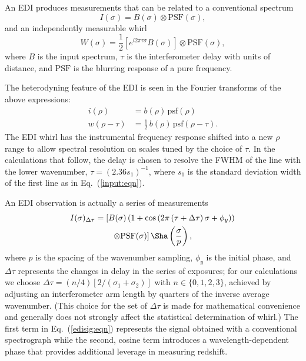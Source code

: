 \documentclass[preprint2, 10pt]{aastex}
\begin{document}
{An EDI produces measurements that can be related
to a conventional spectrum
\begin{equation}
I(\sigma) = B(\sigma) \otimes \mbox{PSF}(\sigma),
\end{equation}
and an independently measurable whirl
\begin{equation}
W(\sigma) = \frac{1}{2}\left[e^{i2\pi\tau\sigma}B(\sigma)\right] \otimes \mbox{PSF}(\sigma),
\end{equation}
where $B$ is the input spectrum, $\tau$ is the interferometer delay
with units of distance, and $\mbox{PSF}$  is the blurring
response of a pure frequency.

The heterodyning feature of the EDI is seen in the Fourier transforms of the above expressions:
\begin{align}
i(\rho) & =b(\rho) \, \mbox{psf}(\rho)\\
w(\rho -\tau) & =\frac{1}{2}\, b(\rho) \, \mbox{psf}(\rho-\tau).
\end{align}
The EDI whirl has the instrumental frequency response shifted into a new $\rho$ range to allow
spectral
resolution on scales tuned by the choice of $\tau$.  In the calculations that follow, the delay is chosen to resolve
the FWHM of the line with the lower wavenumber, $\tau = (2.36s_1)^{-1}$, where $s_1$ 
is the standard deviation width of the first line as 
in Eq.~(\ref{input:eqn}). 

An EDI observation is actually a series of measurements
\begin{align}
I(\sigma)_{\Delta\tau} &= \left[B(\sigma)\left(1+\cos{\left(2\pi\left(\tau+\Delta \tau\right)\sigma+\phi_y \right)} \right) \right. \nonumber\\
&\qquad \left. \otimes \mbox{PSF}(\sigma)\right]\Sha\left(\frac{\sigma}{p}\right),
\label{edisig:eqn}
\end{align}
where $p$ is the spacing of the wavenumber sampling, $\phi_y$ is the initial phase,
and $\Delta \tau$ represents the changes in delay in the series of exposures; for our calculations we choose  $\Delta \tau = (n/4)[2/(\sigma_1+\sigma_2)]$ with $n\in\{0,1,2,3\}$, 
achieved by adjusting an interferometer arm length by quarters 
of the inverse average wavenumber. 
(This choice for the set of  $\Delta \tau$ is made for mathematical convenience and generally does not strongly affect the statistical determination of whirl.) 
The first term in Eq.~(\ref{edisig:eqn}) represents the signal obtained with a conventional spectrograph while the second, cosine term
introduces a wavelength-dependent phase that provides additional leverage in measuring redshift.


}
\end{document}
